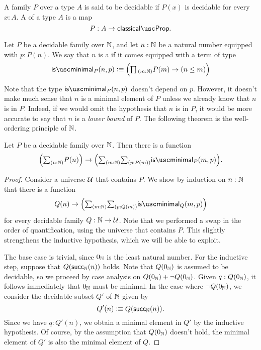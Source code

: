 \begin{defn}
  A family $P$ over a type $A$ is said to be decidable if $P(x)$ is decidable for every $x:A$. A  of a type $A$ is a map
  \begin{equation*}
    P:A\to\classicalprop.
  \end{equation*}
\end{defn}

\begin{defn}
  Let $P$ be a decidable family over ${\mathbb{N}}$, and let $n:{\mathbb{N}}$ be a natural number equipped with $p:P(n)$. We say that $n$ is a  if it comes equipped with a term of type
  \begin{equation*}
    \isminimal_P(n,p)\defeq \Big(\prd{m:\N}P(m)\to (n\leq m)\Big)
  \end{equation*}
\end{defn}

Note that the type $\isminimal_P(n,p)$ doesn't depend on $p$. However, it doesn't make much sense that $n$ is a minimal element of $P$ unless we already know that $n$ is in $P$. Indeed, if we would omit the hypothesis that $n$ is in $P$, it would be more accurate to say that $n$ is a \emph{lower bound} of $P$. The following theorem is the well-ordering principle of ${\mathbb{N}}$. 

\begin{thm}
  Let $P$ be a decidable family over ${\mathbb{N}}$. Then there is a function
  \begin{equation*}
    \Big(\sm{n:\N}P(n)\Big)\to\Big(\sm{m:\N}{p:P(m)}\isminimal_P(m,p)\Big).
  \end{equation*}
\end{thm}

\begin{proof}
  Consider a universe $\mathcal{U}$ that contains $P$. We show by induction on $n:{\mathbb{N}}$ that there is a function
  \begin{equation*}
    Q(n)\to \Big(\sm{m:\N}{p:Q(m)}\isminimal_Q(m,p)\Big) 
  \end{equation*}
  for every decidable family $Q:{\mathbb{N}}\to\mathcal{U}$. Note that we performed a swap in the order of quantification, using the universe that contains $P$. This slightly strengthens the inductive hypothesis, which we will be able to exploit.

  The base case is trivial, since $0_{{\mathbb{N}}}$ is the least natural number. For the inductive step, suppose that $Q(\mathsf{succ}_{{\mathbb{N}}}(n))$ holds. Note that $Q(0_{{\mathbb{N}}})$ is assumed to be decidable, so we proceed by case analysis on $Q(0_{{\mathbb{N}}})+\neg Q(0_{{\mathbb{N}}})$. Given $q:Q(0_{{\mathbb{N}}})$, it follows immediately that $0_{{\mathbb{N}}}$ must be minimal. In the case where $\neg Q(0_{{\mathbb{N}}})$, we consider the decidable subset $Q'$ of ${\mathbb{N}}$ given by
  \begin{equation*}
    Q'(n)\vcentcolon\equiv Q(\mathsf{succ}_{{\mathbb{N}}}(n)).
  \end{equation*}
  Since we have $q:Q'(n)$, we obtain a minimal element in $Q'$ by the inductive hypothesis. Of course, by the assumption that $Q(0_{{\mathbb{N}}})$ doesn't hold, the minimal element of $Q'$ is also the minimal element of $Q$.
\end{proof}


